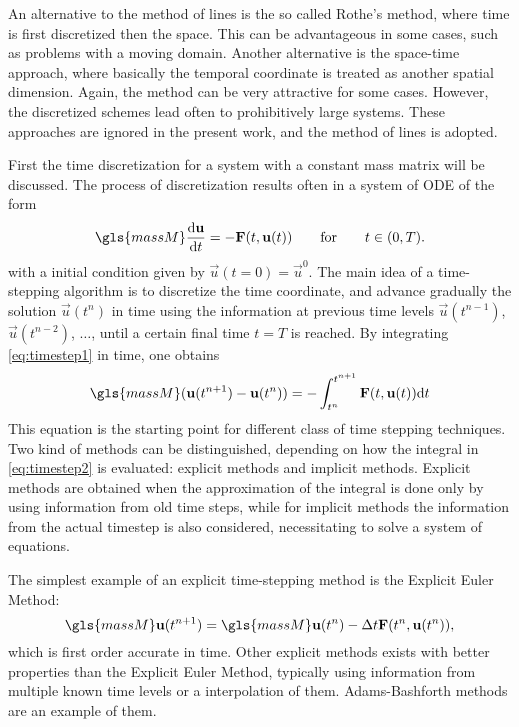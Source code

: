 An alternative to the method of lines is the so called Rothe's method, where time is first discretized then the space. This can be advantageous in some cases, such as problems with a moving domain. Another alternative is the space-time approach, where basically the temporal coordinate is treated as another spatial dimension. Again, the method can be very attractive for some cases. However, the discretized schemes lead often to prohibitively large systems. These approaches are ignored in the present work, and the method of lines is adopted.

First the time discretization for a system with a constant mass matrix will be discussed. The process of discretization results often in a system of \gls{ODE} of the form
\begin{equation}
\gls{massM}\frac{\text{d}\vec{u}}{\text{d}t} = - \vec{F}(t,\vec{u}(t))\qquad \text{for}\qquad t \in (0,T).\label{eq:timestep1}
\end{equation}
with a initial condition given by $\vec{u}(t=0) = \vec{u}^0$. The main idea of a time-stepping algorithm is to discretize the time coordinate, and advance gradually the solution $\vec{u}(t^n)$ in time using the information  at previous time levels $\vec{u}(t^{n-1})$, $\vec{u}(t^{n-2})$, $\dots$,  until a certain final time $t = T$ is reached.
By integrating \cref{eq:timestep1} in time, one obtains
\begin{equation}
\gls{massM}(\vec{u}(t^{n+1})-\vec{u}(t^{n})) = - \int_{t^n}^{t^{n+1}}\vec{F}(t,\vec{u}(t)) \text{d}t \label{eq:timestep2}
\end{equation}
This equation is the starting point for different class of time stepping techniques. Two kind of methods can be distinguished, depending on how the integral in \cref{eq:timestep2} is evaluated: explicit methods and implicit methods. Explicit methods are obtained when the approximation of the integral is done only by using information from old time steps, while for implicit methods the information from the actual timestep is also considered, necessitating to solve a system of equations.

The simplest example of an explicit time-stepping method is the Explicit Euler Method:
\begin{equation}
\gls{massM}\vec{u}(t^{n+1})= \gls{massM}\vec{u}(t^{n})  - \Delta t \vec{F}(t^n,\vec{u}(t^n)),
\end{equation}
which is first order accurate in time. Other explicit methods exists with better properties than the Explicit Euler Method, typically using information from multiple known time levels or a interpolation of them. Adams-Bashforth methods are an example of them. 

